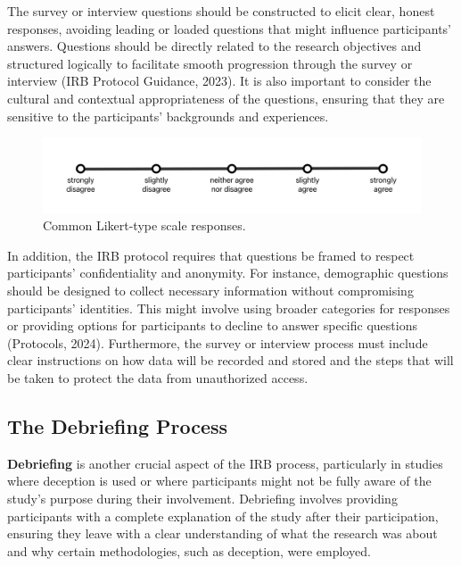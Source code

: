 \documentclass[
]{book}
\begin{document}
The survey or interview questions should be constructed to elicit clear, honest responses, avoiding leading or loaded questions that might influence participants' answers. Questions should be directly related to the research objectives and structured logically to facilitate smooth progression through the survey or interview (IRB Protocol Guidance, 2023). It is also important to consider the cultural and contextual appropriateness of the questions, ensuring that they are sensitive to the participants' backgrounds and experiences.

\begin{figure}
\centering
\includegraphics[width=1\linewidth,height=\textheight,keepaspectratio]{images/likert-scale.png}
\caption{Common Likert-type scale responses.}
\end{figure}

In addition, the IRB protocol requires that questions be framed to respect participants' confidentiality and anonymity. For instance, demographic questions should be designed to collect necessary information without compromising participants' identities. This might involve using broader categories for responses or providing options for participants to decline to answer specific questions (Protocols, 2024). Furthermore, the survey or interview process must include clear instructions on how data will be recorded and stored and the steps that will be taken to protect the data from unauthorized access.

\subsection*{The Debriefing Process}\label{the-debriefing-process}

\textbf{Debriefing} is another crucial aspect of the IRB process, particularly in studies where deception is used or where participants might not be fully aware of the study's purpose during their involvement. Debriefing involves providing participants with a complete explanation of the study after their participation, ensuring they leave with a clear understanding of what the research was about and why certain methodologies, such as deception, were employed.
\end{document}
